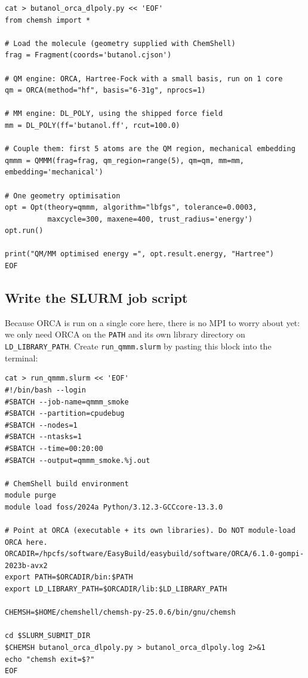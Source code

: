 \documentclass[12pt,a4paper]{article}
\begin{document}
\noindent %
\begin{minipage}{\linewidth}
\begin{lstlisting}[style=shell]
cat > butanol_orca_dlpoly.py << 'EOF'
from chemsh import *

# Load the molecule (geometry supplied with ChemShell)
frag = Fragment(coords='butanol.cjson')

# QM engine: ORCA, Hartree-Fock with a small basis, run on 1 core
qm = ORCA(method="hf", basis="6-31g", nprocs=1)

# MM engine: DL_POLY, using the shipped force field
mm = DL_POLY(ff='butanol.ff', rcut=100.0)

# Couple them: first 5 atoms are the QM region, mechanical embedding
qmmm = QMMM(frag=frag, qm_region=range(5), qm=qm, mm=mm, embedding='mechanical')

# One geometry optimisation
opt = Opt(theory=qmmm, algorithm="lbfgs", tolerance=0.0003, 
          maxcycle=300, maxene=400, trust_radius='energy')
opt.run()

print("QM/MM optimised energy =", opt.result.energy, "Hartree")
EOF
\end{lstlisting}
\end{minipage}

\subsection{Write the SLURM job script}

Because ORCA is run on a single core here, there is no MPI to worry about yet: we only need ORCA on the \texttt{PATH} and its own library directory on \texttt{LD\_LIBRARY\_PATH}. Create \texttt{run\_qmmm.slurm} by pasting this block into the terminal:\\

\noindent %
\begin{minipage}{\linewidth}
\begin{lstlisting}[style=shell]
cat > run_qmmm.slurm << 'EOF'
#!/bin/bash --login
#SBATCH --job-name=qmmm_smoke
#SBATCH --partition=cpudebug
#SBATCH --nodes=1
#SBATCH --ntasks=1
#SBATCH --time=00:20:00
#SBATCH --output=qmmm_smoke.%j.out

# ChemShell build environment
module purge
module load foss/2024a Python/3.12.3-GCCcore-13.3.0

# Point at ORCA (executable + its own libraries). Do NOT module-load ORCA here.
ORCADIR=/hpcfs/software/EasyBuild/easybuild/software/ORCA/6.1.0-gompi-2023b-avx2
export PATH=$ORCADIR/bin:$PATH
export LD_LIBRARY_PATH=$ORCADIR/lib:$LD_LIBRARY_PATH

CHEMSH=$HOME/chemshell/chemsh-py-25.0.6/bin/gnu/chemsh

cd $SLURM_SUBMIT_DIR
$CHEMSH butanol_orca_dlpoly.py > butanol_orca_dlpoly.log 2>&1
echo "chemsh exit=$?"
EOF
\end{lstlisting}
\end{minipage}
\end{document}
